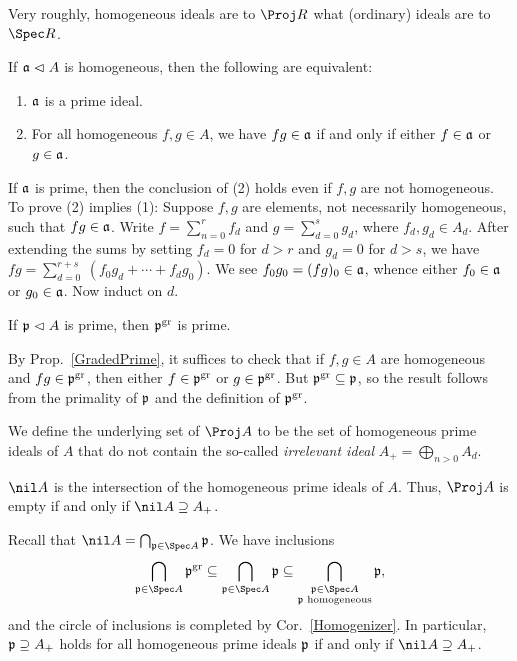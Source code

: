 \documentclass[10pt,final,oneside]{amsbook}
\makeatletter
\renewenvironment{proof}[1][\proofname] 
{ 	
	\par\pushQED{\qed}\normalfont\topsep6\p@\@plus6\p@\relax\trivlist\itemindent\normalparindent
	\item[\hskip\labelsep\itshape#1\@addpunct{.}]\ignorespaces
}
{
	\popQED\endtrivlist\@endpefalse
}
\numberwithin{equation}{section}
\newcommand{\gr}{\mathrm{gr}}
\makeatother
\begin{document}
Very roughly, homogeneous ideals are to $\Proj R$ what (ordinary) ideals are to $\Spec R$.

\begin{prop}\label{GradedPrime}
If $\mathfrak{a} \vartriangleleft A$ is homogeneous, then the following are equivalent:
\begin{enumerate}
\item 	$\mathfrak{a}$ is a prime ideal.
\item 	For all homogeneous $f, g \in A$, we have $fg \in \mathfrak{a}$ if and only if either $f \in\mathfrak{a}$ or $g \in \mathfrak{a}$.
\end{enumerate}
\end{prop}

\begin{proof}
If $\mathfrak{a}$ is prime, then the conclusion of (2) holds even if $f, g$ are not homogeneous.
To prove (2) implies (1):
Suppose $f, g$ are elements, not necessarily homogeneous, such that $fg \in \mathfrak{a}$.
Write $f = \sum_{n = 0}^r f_d$ and $g = \sum_{d = 0}^s g_d$, where $f_d, g_d \in A_d$.
After extending the sums by setting $f_d= 0$ for $d > r$ and $g_d = 0$ for $d > s$, we have $fg = \sum_{d = 0}^{r + s}~(f_0g_d + \cdots + f_dg_0)$.
We see $f_0g_0 = (fg)_0 \in \mathfrak{a}$, whence either $f_0 \in \mathfrak{a}$ or $g_0 \in \mathfrak{a}$.
Now induct on $d$.
\end{proof}

\begin{cor}\label{Homogenizer}
If $\mathfrak{p} \vartriangleleft A$ is prime, then $\fr{p}^\gr$ is prime.
\end{cor}

\begin{proof}
By Prop.~\ref{GradedPrime}, it suffices to check that if $f,g\in A$ are homogeneous and $fg \in \fr{p}^\gr$, then either $f \in \fr{p}^\gr$ or $g \in \fr{p}^\gr$.
But $\fr{p}^\gr \subeq \fr{p}$, so the result follows from the primality of $\mathfrak{p}$ and the definition of $\fr{p}^\gr$.
\end{proof}

We define the underlying set of $\Proj A$ to be the set of homogeneous prime ideals of $A$ that do not contain the so-called \emph{irrelevant ideal} $A_+ = \bigoplus_{n > 0} A_d$.

\begin{cor}\label{GradedNil}
$\nil A$ is the intersection of the homogeneous prime ideals of $A$.
Thus, $\Proj A$ is empty if and only if $\nil A \supseteq A_+$.
\end{cor}

\begin{proof}
Recall that $\nil A = \bigcap_{\fr{p} \in \Spec A} \fr{p}$.
We have inclusions
\begin{align}
\bigcap_{\fr{p} \in \Spec A} \fr{p}^\gr
\subeq 		\bigcap_{\fr{p} \in\Spec A} \fr{p} 
\subeq 		\bigcap_{\substack{\fr{p} \in \Spec A \\ \text{$\fr{p}$ homogeneous}}} \fr{p},
\end{align}
and the circle of inclusions is completed by Cor.~\ref{Homogenizer}.
In particular, $\mathfrak{p} \supseteq A_+$ holds for all homogeneous prime ideals $\mathfrak{p}$ if and only if $\nil A \supseteq A_+$.
\end{proof}
\end{document}
